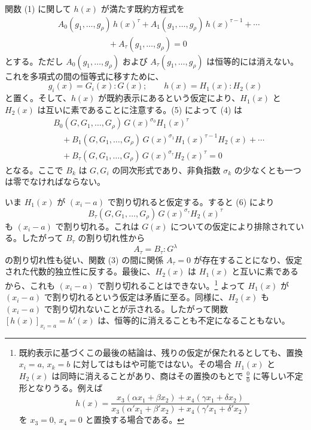 \documentclass[11pt]{jlreq}
\begin{document}
関数 (1) に関して $h(x)$ が満たす既約方程式を
\begin{equation}
\begin{aligned}
&A_0(g_1,\ldots,g_\rho)\,h(x)^\tau
 +A_1(g_1,\ldots,g_\rho)\,h(x)^{\tau-1}
 +\cdots \\
&\hspace{6em}+A_\tau(g_1,\ldots,g_\rho)=0
\end{aligned}
\tag{4}
\end{equation}
とする。ただし $A_0(g_1,\ldots,g_\rho)$ および $A_\tau(g_1,\ldots,g_\rho)$ は恒等的には消えない。これを多項式の間の恒等式に移すために、
\begin{equation}
  g_i(x)=G_i(x):G(x);\qquad h(x)=H_1(x):H_2(x)
\tag{5}
\end{equation}
と置く。そして、$h(x)$ が既約表示にあるという仮定により、$H_1(x)$ と $H_2(x)$ は互いに素であることに注意する。(5) によって (4) は
\begin{equation}
\begin{aligned}
&B_0(G,G_1,\ldots,G_\rho)\,G(x)^{\sigma_0}H_1(x)^\tau \\
&\quad+B_1(G,G_1,\ldots,G_\rho)\,G(x)^{\sigma_1}H_1(x)^{\tau-1}H_2(x)+\cdots \\
&\quad+B_\tau(G,G_1,\ldots,G_\rho)\,G(x)^{\sigma_\tau}H_2(x)^\tau=0
\end{aligned}
\tag{6}
\end{equation}
となる。ここで $B_k$ は $G,G_i$ の同次形式であり、非負指数 $\sigma_k$ の少なくとも一つは零でなければならない。

いま $H_1(x)$ が $(x_i-a)$ で割り切れると仮定する。すると (6) により
\[
  B_\tau(G,G_1,\ldots,G_\rho)\,G(x)^{\sigma_\tau}H_2(x)^\tau
\]
も $(x_i-a)$ で割り切れる。これは $G(x)$ についての仮定により排除されている。したがって $B_\tau$ の割り切れ性から
\[
  A_\tau=B_\tau:G^\lambda
\]
の割り切れ性も従い、関数 (3) の間に関係 $A_\tau=0$ が存在することになり、仮定された代数的独立性に反する。最後に、$H_2(x)$ は $H_1(x)$ と互いに素であるから、これも $(x_i-a)$ で割り切れることはできない。\footnote{既約表示に基づくこの最後の結論は、残りの仮定が保たれるとしても、置換 $x_i=a$, $x_k=b$ に対してはもはや可能ではない。その場合 $H_1(x)$ と $H_2(x)$ は同時に消えることがあり、商はその置換のもとで $\frac{0}{0}$ に等しい不定形となりうる。例えば
\[
 h(x)=\frac{x_3(\alpha x_1+\beta x_2)+x_4(\gamma x_1+\delta x_2)}
 {x_3(\alpha' x_1+\beta' x_2)+x_4(\gamma' x_1+\delta' x_2)}
\]
を $x_3=0$, $x_4=0$ と置換する場合である。} よって $H_1(x)$ が $(x_i-a)$ で割り切れるという仮定は矛盾に至る。同様に、$H_2(x)$ も $(x_i-a)$ で割り切れないことが示される。したがって関数 $[h(x)]_{x_i=a}=h'(x)$ は、恒等的に消えることも不定になることもない。
\end{document}
